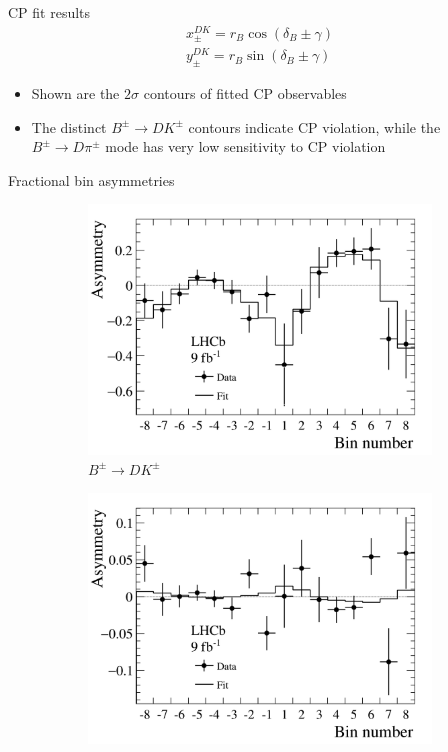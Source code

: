 \documentclass{beamer}
\begin{document}
\begin{frame}{CP fit results}
  \vspace{-0.3cm}
  \begin{align*}
    x_\pm^{DK} = r_B\cos(\delta_B\pm\gamma) \\
    y_\pm^{DK} = r_B\sin(\delta_B\pm\gamma)
  \end{align*}
  \vspace{-0.5cm}
  \begin{itemize}
    \item{Shown are the $2\sigma$ contours of fitted CP observables}
    \item{The distinct $B^\pm\to DK^\pm$ contours indicate CP violation, while the $B^\pm\to D\pi^\pm$ mode has very low sensitivity to CP violation}
  \end{itemize}
\end{frame}

\begin{frame}{Fractional bin asymmetries}
  \begin{figure}
    \centering
    \vspace{-0.2cm}
    \begin{subfigure}{0.5\textwidth}
      \includegraphics[width = 1.0\textwidth]{Plots/BinAsymmetries_dk.png}
      \caption{$B^\pm\to DK^\pm$}
    \end{subfigure}%
    \begin{subfigure}{0.5\textwidth}
      \includegraphics[width = 1.0\textwidth]{Plots/BinAsymmetries_dpi.png}

\end{subfigure}
\end{figure}
\end{frame}
\end{document}

